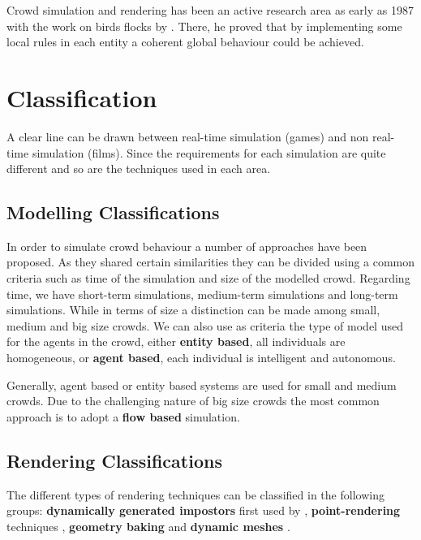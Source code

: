 \documentclass[11pt,twocolumn]{article}
\numberwithin{equation}{section} %
\numberwithin{figure}{section} %
\numberwithin{table}{section} %
\begin{document}
Crowd simulation and rendering has been an active research area as early as 1987 with the work on birds flocks by \cite{Reynolds1987}.
There, he proved that by implementing some local rules in each entity a coherent global behaviour could be achieved.

\section{Classification}

A clear line can be drawn between real-time simulation (games) and non real-time simulation (films).
Since the requirements for each simulation are quite different and so are the techniques used in each area.

\subsection{Modelling Classifications}

In order to simulate crowd behaviour a number of approaches have been proposed.
As they shared certain similarities they can be divided using a common criteria such as time of the simulation and size of the modelled crowd.
Regarding time, we have short-term simulations, medium-term simulations and long-term simulations.
While in terms of size a distinction can be made among small, medium and big size crowds.
We can also use as criteria the type of model used for the agents in the crowd, either \textbf{entity based}, all individuals are homogeneous, or \textbf{agent based}, each individual is intelligent and autonomous.

Generally, agent based or entity based systems are used for small and medium crowds.
Due to the challenging nature of big size crowds the most common approach is to adopt a \textbf{flow based} simulation.

\subsection{Rendering Classifications}

The different types of rendering techniques can be classified in the following groups: \textbf{dynamically generated impostors} first used by  \cite{Aubel2000}, \textbf{point-rendering} techniques \cite{Wand2002}, \textbf{geometry baking} \cite{Ulicny2004} and \textbf{dynamic meshes} \cite{Ciechomski2005}.

%
\end{document}
